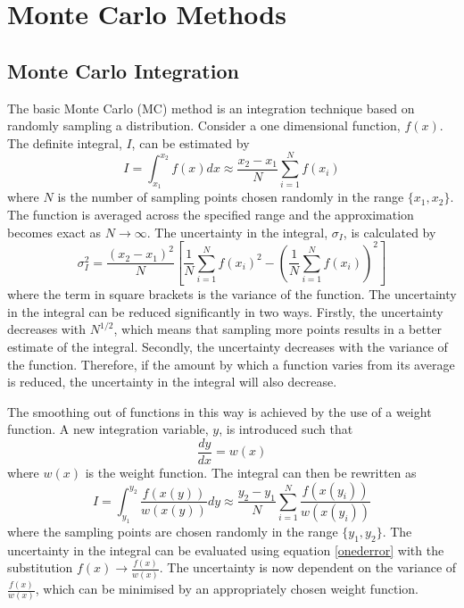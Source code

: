 \section{Monte Carlo Methods} \label{mcmethods}

\subsection{Monte Carlo Integration}

The basic Monte Carlo (MC) method is an integration technique based on randomly sampling a distribution. Consider a one dimensional function, $f(x)$. The definite integral, $I$, can be estimated \cite{Langanke:1993qn} by 
\begin{equation} \label{onedint}
I = \int^{x_{2}}_{x_{1}} f(x) dx \approx \frac{x_{2}-x_{1}}{N} \sum_{i=1}^{N} f(x_i)
\end{equation} 
where $N$ is the number of sampling points chosen randomly in the range $\{x_{1}, x_{2}\}$. The function is averaged across the specified range and the approximation becomes exact as $N\rightarrow\infty$. The uncertainty in the integral, $\sigma_I$, is calculated by
\begin{equation}\label{onederror}
\sigma_{I}^2  = \frac{\left(x_2 - x_1\right)^2}{N}\left[\frac{1}{N}\sum_{i=1}^{N} f(x_i)^2 - \left(\frac{1}{N}\sum_{i=1}^{N}f(x_i)\right)^2 \right]
\end{equation}
where the term in square brackets is the variance of the function.
The uncertainty in the integral can be reduced significantly in two ways. Firstly, the uncertainty  decreases with $N^{1/2}$, which means that sampling more points results in a better estimate of the integral. Secondly, the uncertainty decreases with the variance of the function. Therefore, if the amount by which a function varies from its average is reduced, the uncertainty in the integral will also decrease.

The smoothing out of functions in this way is achieved by the use of a weight function. A new integration variable, $y$, is introduced such that
\begin{equation}\label{changeintvar}
\frac{dy}{dx} = w(x)
\end{equation}
where $w(x)$ is the weight function.
The integral can then be rewritten as 
\begin{equation}\label{ndint}
I = \int^{y_{2}}_{y_{1}} \frac{f(x(y))}{w(x(y))} dy \approx \frac{y_{2} - y_{1}}{N} \sum_{i=1}^{N} \frac{f(x(y_i))}{w(x(y_i))}
\end{equation}
 where the sampling points are chosen randomly in the range $\{y_{1}, y_{2}\}$. The uncertainty in the integral can be evaluated using equation \ref{onederror} with the substitution $f(x)\rightarrow\frac{f(x)}{w(x)}$. The uncertainty is now dependent on the variance of $\frac{f(x)}{w(x)}$, which can be minimised by an appropriately chosen weight function. 
 
